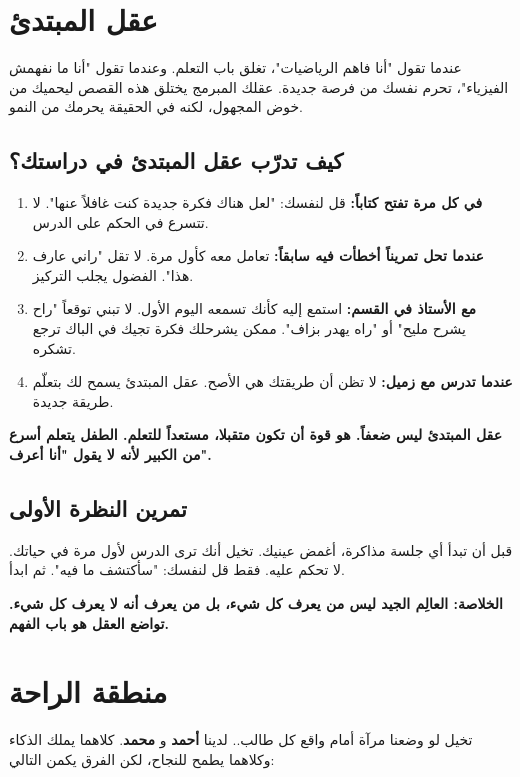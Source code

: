 \documentclass[12pt,a4paper]{book}
\newcommand{\importantAr}[1]{%
	\begin{important}
		\bfseries #1
	\end{important}
}
\begin{document}
	
	\section{عقل المبتدئ}
	\label{sec:beginners-mind}
	
	عندما تقول "أنا فاهم الرياضيات"، تغلق باب التعلم. وعندما تقول "أنا ما نفهمش الفيزياء"، تحرم نفسك من فرصة جديدة. عقلك المبرمج يختلق هذه القصص ليحميك من خوض المجهول، لكنه في الحقيقة يحرمك من النمو.
	
	\subsection{كيف تدرّب عقل المبتدئ في دراستك؟}
	
	\begin{enumerate}
		\item \textbf{في كل مرة تفتح كتاباً:} قل لنفسك: "لعل هناك فكرة جديدة كنت غافلاً عنها". لا تتسرع في الحكم على الدرس.
		\item \textbf{عندما تحل تمريناً أخطأت فيه سابقاً:} تعامل معه كأول مرة. لا تقل "راني عارف هذا". الفضول يجلب التركيز.
		\item \textbf{مع الأستاذ في القسم:} استمع إليه كأنك تسمعه اليوم الأول. لا تبني توقعاً "راح يشرح مليح" أو "راه يهدر بزاف". ممكن يشرحلك فكرة تجيك في الباك ترجع تشكره.
		\item \textbf{عندما تدرس مع زميل:} لا تظن أن طريقتك هي الأصح. عقل المبتدئ يسمح لك بتعلّم طريقة جديدة.
	\end{enumerate}
	
	\importantAr{عقل المبتدئ ليس ضعفاً. هو قوة أن تكون متقبلا، مستعداً للتعلم. الطفل يتعلم أسرع من الكبير لأنه لا يقول "أنا أعرف".}
	
	\subsection{تمرين النظرة الأولى}
	
	قبل أن تبدأ أي جلسة مذاكرة، أغمض عينيك. تخيل أنك ترى الدرس لأول مرة في حياتك. لا تحكم عليه. فقط قل لنفسك: "سأكتشف ما فيه". ثم ابدأ.
	
	\importantAr{الخلاصة: العالِم الجيد ليس من يعرف كل شيء، بل من يعرف أنه لا يعرف كل شيء. تواضع العقل هو باب الفهم.}
	
	\section{منطقة الراحة}
	\label{sec:owner-experiences}
	
	تخيل لو وضعنا مرآة أمام واقع كل طالب.. لدينا \textbf{أحمد} و\textbf{ محمد}. كلاهما يملك الذكاء وكلاهما يطمح للنجاح، لكن الفرق يكمن التالي:
	
\end{document}
